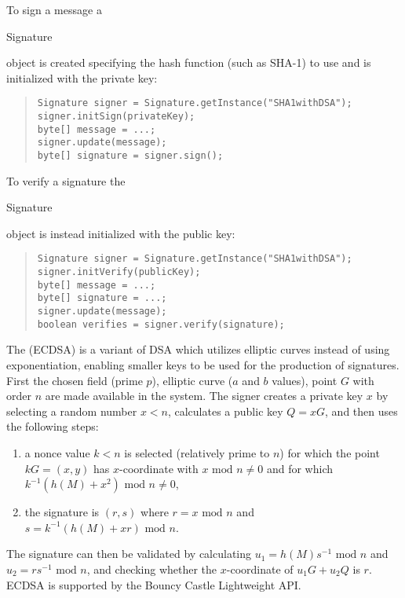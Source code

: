 To sign a message a \begin{code}Signature\end{code} object is created
specifying the hash function (such as SHA-1) to use and is
initialized with the private key:
\begin{quote}\begin{code}\begin{verbatim}
Signature signer = Signature.getInstance("SHA1withDSA");
signer.initSign(privateKey);
byte[] message = ...;
signer.update(message);
byte[] signature = signer.sign();
\end{verbatim}\end{code}\end{quote}
To verify a signature the \begin{code}Signature\end{code} object is
instead initialized with the public key:
\begin{quote}\begin{code}\begin{verbatim}
Signature signer = Signature.getInstance("SHA1withDSA");
signer.initVerify(publicKey);
byte[] message = ...;
byte[] signature = ...;
signer.update(message);
boolean verifies = signer.verify(signature);
\end{verbatim}\end{code}\end{quote}

The  (ECDSA) is a variant of DSA
which utilizes elliptic curves instead of using exponentiation, enabling smaller
keys to be used for the production of signatures.
First the chosen field (prime $p$), elliptic curve ($a$ and $b$ values),
point $G$ with order $n$ are made available in the system.
The signer creates a private key $x$ by selecting a random number $x<n$,
calculates a public key $Q=xG$, and then uses the following steps:
\begin{enumerate}
  \item a nonce value $k<n$ is selected (relatively prime to $n$)
  for which the point $kG=(x,y)$ has $x$-coordinate with $x\mbox{ mod }n\neq0$ and
  for which $k^{-1}\left(h(M)+x^2\right)\mbox{ mod }n\neq0$,
  \item the signature is $(r,s)$ where $r=x\mbox{ mod }n$ and
  $s=k^{-1}\left(h(M)+xr\right)\mbox{ mod }n$.
\end{enumerate}
The signature can then be validated by calculating
$u_1=h(M)s^{-1}\mbox{ mod }n$ and $u_2=r s^{-1}\mbox{ mod }n$,
and checking whether the $x$-coordinate of $u_1G+u_2Q$ is $r$.
ECDSA is supported by the Bouncy Castle Lightweight API.

